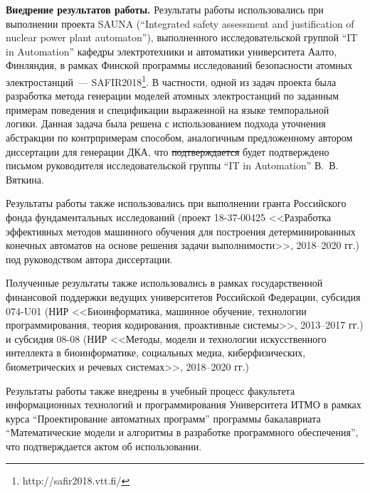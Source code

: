 \textbf{Внедрение результатов работы.}
Результаты работы использовались при выполнении проекта SAUNA (``Integrated safety assessment and justification of nuclear power plant automaton''), выполненного исследовательской группой ``IT in Automation'' кафедры электротехники и автоматики университета Аалто, Финляндия, в рамках Финской программы исследований безопасности атомных электростанций~--- SAFIR2018\footnote{http://safir2018.vtt.fi/}.
В частности, одной из задач проекта была разработка метода генерации моделей атомных электростанций по заданным примерам поведения и спецификации выраженной на языке темпоральной логики.
Данная задача была решена с использованием подхода уточнения абстракции по контрпримерам способом, аналогичным предложенному автором диссертации для генерации ДКА, что \sout{подтверждается} будет подтверждено письмом руководителя исследовательской группы ``IT in Automation'' В.~В. Вяткина.

Результаты работы также использовались при выполнении гранта Российского фонда фундаментальных исследований (проект 18-37-00425 <<Разработка эффективных методов машинного обучения для построения детерминированных конечных автоматов на основе решения задачи выполнимости>>, 2018--2020 гг.) под руководством автора диссертации.

Полученные результаты также использовались в рамках государственной финансовой поддержки ведущих университетов Российской Федерации, субсидия 074-U01 (НИР <<Биоинформатика, машинное обучение, технологии программирования, теория кодирования, проактивные системы>>, 2013--2017 гг.) и субсидия 08-08 (НИР <<Методы, модели и технологии искусственного интеллекта в биоинформатике, социальных медиа, киберфизических, биометрических и речевых системах>>, 2018--2020 гг.)

Результаты работы также внедрены в учебный процесс факультета информационных технологий и программирования Университета ИТМО в рамках курса ``Проектирование автоматных программ'' программы бакалавриата ``Математические модели и алгоритмы в разработке программного обеспечения'', что подтверждается актом об использовании.

